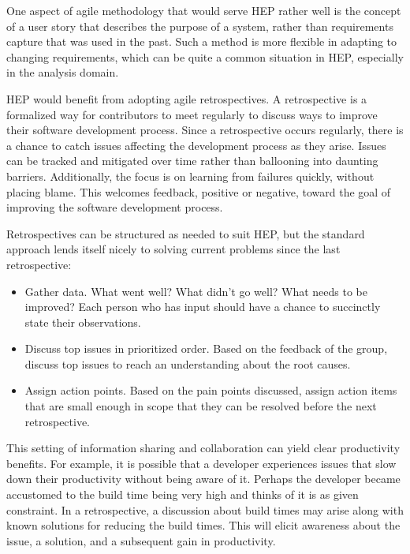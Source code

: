 \documentclass[12pt,a4paper]{article}
\begin{document}
One aspect of agile methodology that would serve HEP rather well is the
concept of a user story that describes the purpose of a system, rather
than requirements capture that was used in the past. Such a method is
more flexible in adapting to changing requirements, which can be quite a
common situation in HEP, especially in the analysis domain.

HEP would benefit from adopting agile retrospectives. A retrospective is
a formalized way for contributors to meet regularly to discuss ways to
improve their software development process. Since a retrospective occurs
regularly, there is a chance to catch issues affecting the development
process as they arise. Issues can be tracked and mitigated over time
rather than ballooning into daunting barriers. Additionally, the focus
is on learning from failures quickly, without placing blame. This
welcomes feedback, positive or negative, toward the goal of improving
the software development process.

Retrospectives can be structured as needed to suit HEP, but the standard
approach lends itself nicely to solving current problems since the last
retrospective:

\begin{itemize}
\item
    Gather data. What went well? What didn't go well? What needs to be
  improved? Each person who has input should have a chance to succinctly
  state their observations.
  \item
    Discuss top issues in prioritized order. Based on the feedback of the
  group, discuss top issues to reach an understanding about the root
  causes.
  \item
    Assign action points. Based on the pain points discussed, assign
  action items that are small enough in scope that they can be resolved
  before the next retrospective.
\end{itemize}

This setting of information sharing and collaboration can yield clear
productivity benefits. For example, it is possible that a developer
experiences issues that slow down their productivity without being aware
of it. Perhaps the developer became accustomed to the build time being
very high and thinks of it is as given constraint. In a retrospective, a
discussion about build times may arise along with known solutions for
reducing the build times. This will elicit awareness about the issue, a
solution, and a subsequent gain in productivity.
\end{document}
